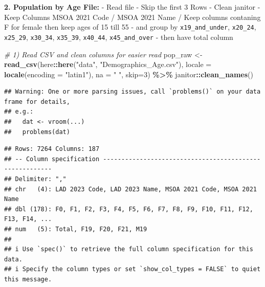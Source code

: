 \documentclass[
]{article}
\newenvironment{Shaded}{\begin{snugshade}}{\end{snugshade}}
\newcommand{\AttributeTok}[1]{\textcolor[rgb]{0.13,0.29,0.53}{#1}}
\newcommand{\CommentTok}[1]{\textcolor[rgb]{0.56,0.35,0.01}{\textit{#1}}}
\newcommand{\DecValTok}[1]{\textcolor[rgb]{0.00,0.00,0.81}{#1}}
\newcommand{\FunctionTok}[1]{\textcolor[rgb]{0.13,0.29,0.53}{\textbf{#1}}}
\newcommand{\NormalTok}[1]{#1}
\newcommand{\OtherTok}[1]{\textcolor[rgb]{0.56,0.35,0.01}{#1}}
\newcommand{\SpecialCharTok}[1]{\textcolor[rgb]{0.81,0.36,0.00}{\textbf{#1}}}
\newcommand{\StringTok}[1]{\textcolor[rgb]{0.31,0.60,0.02}{#1}}
\begin{document}
\textbf{2. Population by Age File:} - Read file - Skip the first 3 Rows
- Clean janitor - Keep Columns MSOA 2021 Code / MSOA 2021 Name / Keep
columns contaning F for female then keep ages of 15 till 55 - and group
by \texttt{x19\_and\_under}, \texttt{x20\_24}, \texttt{x25\_29},
\texttt{x30\_34}, \texttt{x35\_39}, \texttt{x40\_44},
\texttt{x45\_and\_over} - then have total column

\begin{Shaded}
\begin{Highlighting}[]
\CommentTok{\# 1) Read CSV and clean columns for easier read}
\NormalTok{pop\_raw }\OtherTok{\textless{}{-}} \FunctionTok{read\_csv}\NormalTok{(here}\SpecialCharTok{::}\FunctionTok{here}\NormalTok{(}\StringTok{"data"}\NormalTok{, }\StringTok{"Demographics\_Age.csv"}\NormalTok{),}
                       \AttributeTok{locale =} \FunctionTok{locale}\NormalTok{(}\AttributeTok{encoding =} \StringTok{"latin1"}\NormalTok{),}
                       \AttributeTok{na =} \StringTok{" "}\NormalTok{, }\AttributeTok{skip=}\DecValTok{3}\NormalTok{) }\SpecialCharTok{\%\textgreater{}\%}
\NormalTok{  janitor}\SpecialCharTok{::}\FunctionTok{clean\_names}\NormalTok{()}
\end{Highlighting}
\end{Shaded}

\begin{verbatim}
## Warning: One or more parsing issues, call `problems()` on your data frame for details,
## e.g.:
##   dat <- vroom(...)
##   problems(dat)
\end{verbatim}

\begin{verbatim}
## Rows: 7264 Columns: 187
## -- Column specification --------------------------------------------------------
## Delimiter: ","
## chr   (4): LAD 2023 Code, LAD 2023 Name, MSOA 2021 Code, MSOA 2021 Name
## dbl (178): F0, F1, F2, F3, F4, F5, F6, F7, F8, F9, F10, F11, F12, F13, F14, ...
## num   (5): Total, F19, F20, F21, M19
## 
## i Use `spec()` to retrieve the full column specification for this data.
## i Specify the column types or set `show_col_types = FALSE` to quiet this message.
\end{verbatim}
\end{document}
